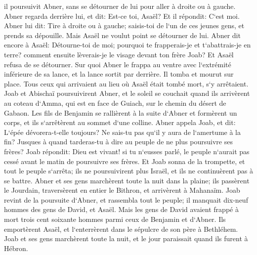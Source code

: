 \verse il poursuivit Abner, sans se détourner de lui pour aller à droite ou à gauche. 
\verse Abner regarda derrière lui, et dit: Est-ce toi, Asaël? Et il répondit: C`est moi. 
\verse Abner lui dit: Tire à droite ou à gauche; saisis-toi de l`un de ces jeunes gens, et prends sa dépouille. Mais Asaël ne voulut point se détourner de lui. 
\verse Abner dit encore à Asaël: Détourne-toi de moi; pourquoi te frapperais-je et t`abattrais-je en terre? comment ensuite lèverais-je le visage devant ton frère Joab? 
\verse Et Asaël refusa de se détourner. Sur quoi Abner le frappa au ventre avec l`extrémité inférieure de sa lance, et la lance sortit par derrière. Il tomba et mourut sur place. Tous ceux qui arrivaient au lieu où Asaël était tombé mort, s`y arrêtaient. 
\verse Joab et Abischaï poursuivirent Abner, et le soleil se couchait quand ils arrivèrent au coteau d`Amma, qui est en face de Guiach, sur le chemin du désert de Gabaon. 
\verse Les fils de Benjamin se rallièrent à la suite d`Abner et formèrent un corps, et ils s`arrêtèrent au sommet d`une colline. 
\verse Abner appela Joab, et dit: L`épée dévorera-t-elle toujours? Ne sais-tu pas qu`il y aura de l`amertume à la fin? Jusques à quand tarderas-tu à dire au peuple de ne plus poursuivre ses frères? 
\verse Joab répondit: Dieu est vivant! si tu n`eusses parlé, le peuple n`aurait pas cessé avant le matin de poursuivre ses frères. 
\verse Et Joab sonna de la trompette, et tout le peuple s`arrêta; ils ne poursuivirent plus Israël, et ils ne continuèrent pas à se battre. 
\verse Abner et ses gens marchèrent toute la nuit dans la plaine; ils passèrent le Jourdain, traversèrent en entier le Bithron, et arrivèrent à Mahanaïm. 
\verse Joab revint de la poursuite d`Abner, et rassembla tout le peuple; il manquait dix-neuf hommes des gens de David, et Asaël. 
\verse Mais les gens de David avaient frappé à mort trois cent soixante hommes parmi ceux de Benjamin et d`Abner. 
\verse Ils emportèrent Asaël, et l`enterrèrent dans le sépulcre de son père à Bethléhem. Joab et ses gens marchèrent toute la nuit, et le jour paraissait quand ils furent à Hébron. 

\chapter{}

